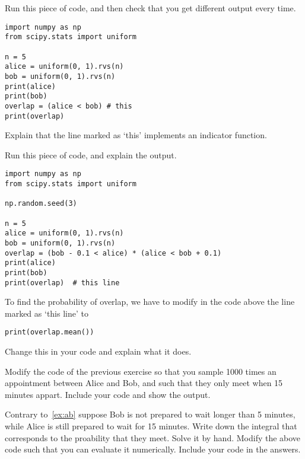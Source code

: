 \begin{exercise}
Run  this piece of code, and then check that you get different output every time.
\begin{verbatim}
import numpy as np
from scipy.stats import uniform

n = 5
alice = uniform(0, 1).rvs(n)
bob = uniform(0, 1).rvs(n)
print(alice)
print(bob)
overlap = (alice < bob) # this
print(overlap)
\end{verbatim}
Explain that the line marked as `this' implements an indicator function.
\end{exercise}


\begin{exercise}
Run  this piece of code, and explain the output.
\begin{verbatim}
import numpy as np
from scipy.stats import uniform

np.random.seed(3)

n = 5
alice = uniform(0, 1).rvs(n)
bob = uniform(0, 1).rvs(n)
overlap = (bob - 0.1 < alice) * (alice < bob + 0.1)
print(alice)
print(bob)
print(overlap)  # this line
\end{verbatim}
\end{exercise}

\begin{exercise}
To find the probability of overlap, we have to modify in the code above the line marked as `this line' to
\begin{verbatim}
print(overlap.mean())
\end{verbatim}
Change this in your code and explain what it does.
\end{exercise}


\begin{exercise}
Modify the  code of the previous exercise so that you sample 1000 times an appointment between Alice and Bob, and such that they only meet when 15 minutes appart. Include your code and show the output.
\end{exercise}


\begin{exercise}
Contrary to~\cref{ex:ab} suppose Bob is not prepared to wait longer than 5 minutes, while Alice is still prepared to wait for 15 minutes. Write down the integral that corresponds to the proability that they meet.  Solve it by hand. Modify the above code such that you can evaluate it numerically. Include your code in the answers.
\end{exercise}

